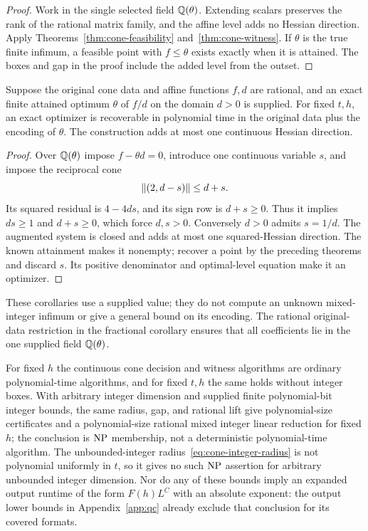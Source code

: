 \begin{proof}
Work in the single selected field $\mathbb Q(\theta)$. Extending scalars
preserves the rank of the rational matrix family, and the affine level
adds no Hessian direction. Apply Theorems~\ref{thm:cone-feasibility}
and~\ref{thm:cone-witness}. If $\theta$ is the true finite infimum,
a feasible point with $f\le\theta$ exists exactly when it is attained.
The boxes and gap in the proof include the added level from the outset.
\end{proof}

\begin{corollary}
\label{cor:cone-fractional}
Suppose the original cone data and affine functions $f,d$ are rational,
and an exact finite attained optimum $\theta$ of $f/d$ on the domain
$d>0$ is supplied. For fixed $t,h$, an exact optimizer is recoverable
in polynomial time in the original data plus the encoding of $\theta$.
The construction adds at most one continuous Hessian direction.
\end{corollary}

\begin{proof}
Over $\mathbb Q(\theta)$ impose $f-\theta d=0$, introduce one continuous
variable $s$, and impose the reciprocal cone
\[
 \left\lVert(2,d-s)\right\rVert\le d+s.
\]
Its squared residual is $4-4ds$, and its sign row is $d+s\ge0$.
Thus it implies $ds\ge1$ and $d+s\ge0$, which force $d,s>0$.
Conversely $d>0$ admits $s=1/d$. The augmented system is closed and
adds at most one squared-Hessian direction. The known attainment makes
it nonempty; recover a point by the preceding theorems and discard $s$.
Its positive denominator and optimal-level equation make it an optimizer.
\end{proof}

These corollaries use a supplied value; they do not compute an unknown
mixed-integer infimum or give a general bound on its encoding. The rational
original-data restriction in the fractional corollary ensures that all
coefficients lie in the one supplied field $\mathbb Q(\theta)$.

For fixed $h$ the continuous cone decision and witness algorithms are
ordinary polynomial-time algorithms, and for fixed $t,h$ the same holds
without integer boxes. With arbitrary integer dimension and supplied
finite polynomial-bit integer bounds, the same radius, gap, and rational
lift give polynomial-size certificates and a polynomial-size rational
mixed integer linear reduction for fixed $h$; the conclusion is $\mathrm{NP}$
membership, not a deterministic polynomial-time algorithm. The
unbounded-integer radius~\eqref{eq:cone-integer-radius} is not polynomial
uniformly in $t$, so it gives no such $\mathrm{NP}$ assertion for arbitrary
unbounded integer dimension. Nor do any of these bounds imply an expanded
output runtime of the form $F(h)L^C$ with an absolute exponent: the output
lower bounds in Appendix~\ref{app:qc} already exclude that conclusion
for its covered formats.


